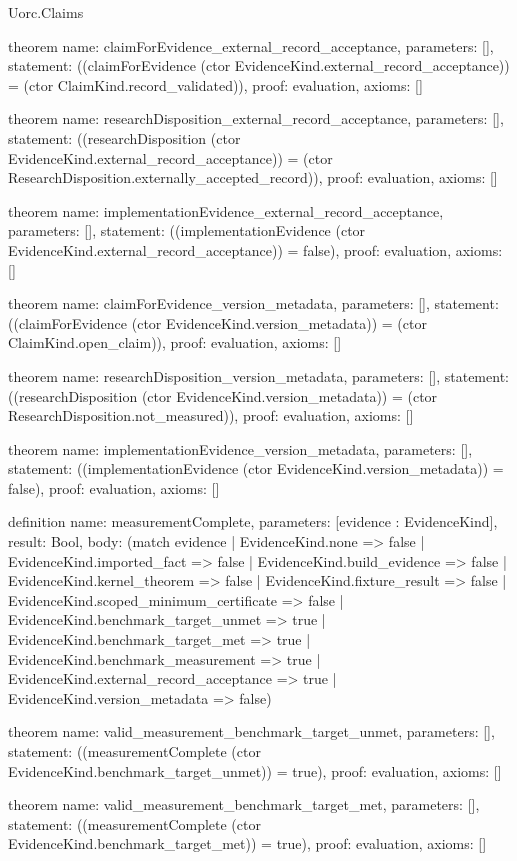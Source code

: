 \begin{lexlean}{Uorc.Claims}
\begin{semanticmodule}
theorem{
  name: claimForEvidence_external_record_acceptance,
  parameters: [],
  statement: ((claimForEvidence (ctor EvidenceKind.external_record_acceptance)) = (ctor ClaimKind.record_validated)),
  proof: evaluation{},
  axioms: []
}

theorem{
  name: researchDisposition_external_record_acceptance,
  parameters: [],
  statement: ((researchDisposition (ctor EvidenceKind.external_record_acceptance)) = (ctor ResearchDisposition.externally_accepted_record)),
  proof: evaluation{},
  axioms: []
}

theorem{
  name: implementationEvidence_external_record_acceptance,
  parameters: [],
  statement: ((implementationEvidence (ctor EvidenceKind.external_record_acceptance)) = false),
  proof: evaluation{},
  axioms: []
}

theorem{
  name: claimForEvidence_version_metadata,
  parameters: [],
  statement: ((claimForEvidence (ctor EvidenceKind.version_metadata)) = (ctor ClaimKind.open_claim)),
  proof: evaluation{},
  axioms: []
}

theorem{
  name: researchDisposition_version_metadata,
  parameters: [],
  statement: ((researchDisposition (ctor EvidenceKind.version_metadata)) = (ctor ResearchDisposition.not_measured)),
  proof: evaluation{},
  axioms: []
}

theorem{
  name: implementationEvidence_version_metadata,
  parameters: [],
  statement: ((implementationEvidence (ctor EvidenceKind.version_metadata)) = false),
  proof: evaluation{},
  axioms: []
}

definition{
  name: measurementComplete,
  parameters: [evidence : EvidenceKind],
  result: Bool,
  body: (match evidence
    | EvidenceKind.none => false
    | EvidenceKind.imported_fact => false
    | EvidenceKind.build_evidence => false
    | EvidenceKind.kernel_theorem => false
    | EvidenceKind.fixture_result => false
    | EvidenceKind.scoped_minimum_certificate => false
    | EvidenceKind.benchmark_target_unmet => true
    | EvidenceKind.benchmark_target_met => true
    | EvidenceKind.benchmark_measurement => true
    | EvidenceKind.external_record_acceptance => true
    | EvidenceKind.version_metadata => false)
}

theorem{
  name: valid_measurement_benchmark_target_unmet,
  parameters: [],
  statement: ((measurementComplete (ctor EvidenceKind.benchmark_target_unmet)) = true),
  proof: evaluation{},
  axioms: []
}

theorem{
  name: valid_measurement_benchmark_target_met,
  parameters: [],
  statement: ((measurementComplete (ctor EvidenceKind.benchmark_target_met)) = true),
  proof: evaluation{},
  axioms: []
}


\end{semanticmodule}
\end{lexlean}
